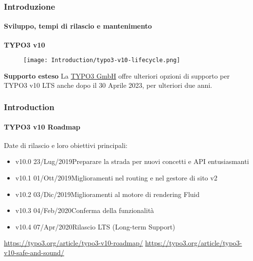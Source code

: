 
\begin{frame}[fragile]
	\frametitle{Introduzione}
	\framesubtitle{Sviluppo, tempi di rilascio e mantenimento}

	\textbf{TYPO3 v10}

	\begin{figure}
		\texttt{[image: Introduction/typo3-v10-lifecycle.png]}
	\end{figure}

	\textbf{Supporto esteso}\newline
	\smaller
		La \href{https://typo3.com}{TYPO3 GmbH} offre ulteriori opzioni di supporto
		per TYPO3 v10 LTS anche dopo il 30 Aprile 2023, per ulteriori due anni.
	\normalsize

\end{frame}


\begin{frame}[fragile]
	\frametitle{Introduction}
	\framesubtitle{TYPO3 v10 Roadmap}

	Date di rilascio e loro obiettivi principali:

	\begin{itemize}

		\item v10.0 \tabto{1.1cm}23/Lug/2019\tabto{3.4cm}Preparare la strada per nuovi concetti e API entusiasmanti
		\item v10.1 \tabto{1.1cm}01/Ott/2019\tabto{3.4cm}Miglioramenti nel routing e nel gestore di sito v2
		\item
			\begingroup
				\color{typo3orange}
				v10.2 \tabto{1.1cm}03/Dic/2019\tabto{3.4cm}Miglioramenti al motore di rendering Fluid
			\endgroup
		\item v10.3 \tabto{1.1cm}04/Feb/2020\tabto{3.4cm}Conferma della funzionalità
		\item v10.4 \tabto{1.1cm}07/Apr/2020\tabto{3.4cm}Rilascio LTS (Long-term Support)

	\end{itemize}

	\smaller
		\url{https://typo3.org/article/typo3-v10-roadmap/}\newline
		\url{https://typo3.org/article/typo3-v10-safe-and-sound/}
	\normalsize

\end{frame}

